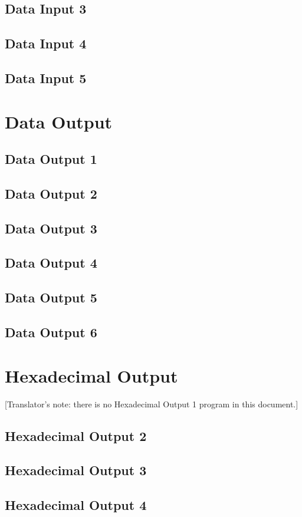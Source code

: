 \documentclass{article}
\begin{document}
\begin{enumerate}
\subsection{Data Input 3}
\subsection{Data Input 4}
\subsection{Data Input 5}
\section{Data Output}
\subsection{Data Output 1}
\subsection{Data Output 2}
\subsection{Data Output 3}
\subsection{Data Output 4}
\subsection{Data Output 5}
\subsection{Data Output 6}
\section{Hexadecimal Output}
[Translator's note: there is no Hexadecimal Output 1 program in this document.]
\subsection{Hexadecimal Output 2}
\subsection{Hexadecimal Output 3}
\subsection{Hexadecimal Output 4}

\end{enumerate}
\end{document}
